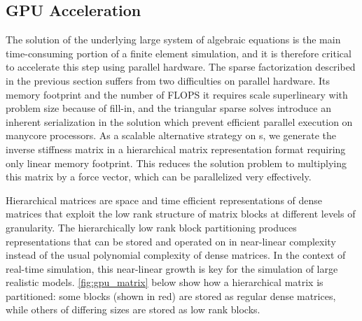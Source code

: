 %



\subsection{GPU Acceleration}
\label{ssec:gpu_acceleration}

The solution of the underlying large system of algebraic equations is the main time-consuming portion of a finite element simulation, and it is therefore critical to accelerate this step using  parallel hardware. The sparse factorization described in the previous section suffers from two difficulties on parallel  hardware. Its memory footprint and the number of FLOPS it requires scale superlineary with problem size because of fill-in, and the triangular sparse solves introduce an inherent serialization in the solution which prevent efficient parallel execution on manycore processors. As a scalable alternative strategy on s, we generate the inverse stiffness matrix in a hierarchical matrix representation format requiring only linear memory footprint.  This reduces the solution problem to multiplying this matrix by a force vector, which can be parallelized very effectively.

Hierarchical matrices are space and time efficient representations of dense matrices that exploit the low rank structure of matrix blocks at different levels of granularity. The hierarchically low rank block partitioning produces representations that can be stored and operated on in near-linear complexity instead of the usual polynomial complexity of dense matrices. In the context of real-time simulation, this near-linear growth is key for the simulation of large realistic models. \autoref{fig:gpu_matrix} below show how a hierarchical matrix is partitioned: some blocks (shown in red) are stored as regular dense matrices, while others of differing sizes are stored as low rank blocks.

